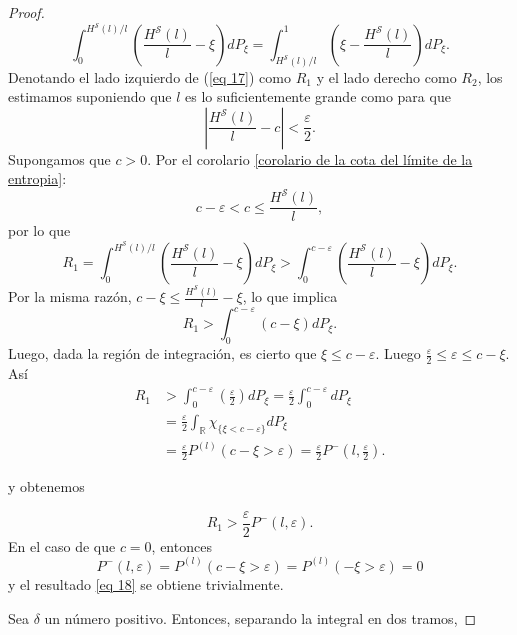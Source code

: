 \documentclass{report}
\begin{document}
\begin{proof}
    \begin{equation}\label{eq 17}
    \int_{0}^{H^{\mathcal{S}}(l)/l} \left( \frac{H^{\mathcal{S}}(l)}{l} - \xi \right) dP_{\xi} =
    \int_{H^{\mathcal{S}}(l)/l}^{1} \left( \xi - \frac{H^{\mathcal{S}}(l)}{l} \right) dP_{\xi}.
    \end{equation}
    Denotando el lado izquierdo de (\ref{eq 17}) como \( R_1 \) y el lado derecho como \( R_2 \), 
    los estimamos suponiendo que \( l \) es lo suficientemente grande como para que 
    \[
    \left| \frac{H^{\mathcal{S}}(l)}{l} - c \right| < \frac{\varepsilon}{2}.
    \]
    Supongamos que $c>0$. Por el corolario \ref{corolario de la cota del límite de la entropia}:
    \[
        c-\varepsilon < c \leq \frac{H^{\mathcal{S}}(l)}{l},
    \]
    por lo que
    \[
        R_1 = \int_{0}^{H^{\mathcal{S}}(l)/l} \left( \frac{H^{\mathcal{S}}(l)}{l} - \xi \right) dP_{\xi}
        > \int_{0}^{c-\varepsilon} \left( \frac{H^{\mathcal{S}}(l)}{l} - \xi \right) dP_{\xi}.
    \]
    Por la misma razón, $c-\xi \leq  \frac{H^{\mathcal{S}}(l)}{l} - \xi$, lo que implica
    \[
        R_1 > \int_{0}^{c-\varepsilon} \left( c - \xi \right) dP_{\xi}.
    \]
    Luego, dada la región de integración, es cierto que $\xi \leq c-\varepsilon$. Luego $\frac{\varepsilon}{2} \leq \varepsilon \leq c-\xi$. Así
    \begin{equation*}
    \begin{aligned}
        R_1 &> \int_{0}^{c-\varepsilon} \left( \frac{\varepsilon}{2}  \right) dP_{\xi} = \frac{\varepsilon}{2} \int_{0}^{c-\varepsilon}dP_{\xi} \\
        &= \frac{\varepsilon}{2} \int_{\mathbb{R}} \chi_{\{\xi< c-\varepsilon\}} dP_{\xi} \\
        &= \frac{\varepsilon}{2} P^{(l)}(c-\xi>\varepsilon) 
        = \frac{\varepsilon}{2} P^-\left(l,\frac{\varepsilon}{2}\right).
    \end{aligned}
    \end{equation*}
    
    y obtenemos
    
    \begin{equation}\label{eq 18}
    R_1 > \frac{\varepsilon}{2} P^-(l, \varepsilon).
    \end{equation}
    En el caso de que $c=0$, entonces 
    \[P^-(l, \varepsilon)= P^{(l)}(c - \xi > \varepsilon) = P^{(l)}(-\xi > \varepsilon) = 0\]
    y el resultado \ref{eq 18}
    se obtiene trivialmente.

    \bigskip

    Sea \( \delta \) un número positivo. Entonces, separando la integral en dos tramos,


\end{proof}
\end{document}
